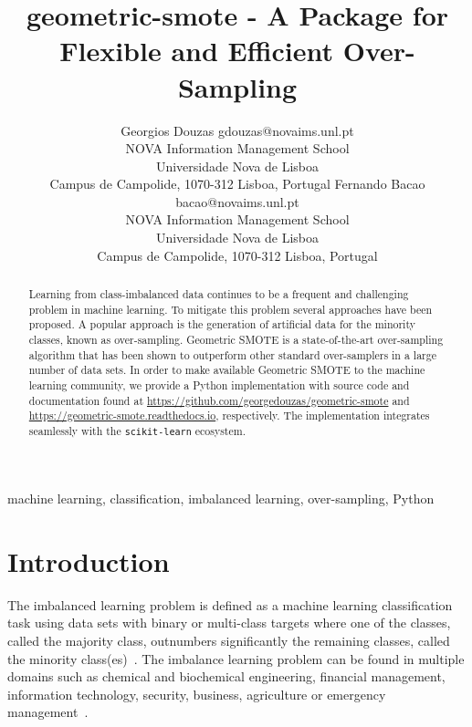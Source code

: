 \documentclass[twoside,11pt]{article}
\begin{document}
\title{geometric-smote - A Package for Flexible and Efficient Over-Sampling}

\author{\name Georgios Douzas \email gdouzas@novaims.unl.pt \\
       \addr NOVA Information Management School\\
       Universidade Nova de Lisboa\\
       Campus de Campolide, 1070-312 Lisboa, Portugal \AND \name Fernando Bacao
       \email bacao@novaims.unl.pt \\
       \addr NOVA Information Management School\\
       Universidade Nova de Lisboa\\
       Campus de Campolide, 1070-312 Lisboa, Portugal}

\editor{}

\maketitle

\begin{abstract}%
	Learning from class-imbalanced data continues to be a frequent and
	challenging problem in machine learning. To mitigate this problem several
	approaches have been proposed. A popular approach is the generation of
	artificial data for the minority classes, known as over-sampling. Geometric
	SMOTE is a state-of-the-art over-sampling algorithm that has been shown to
	outperform other standard over-samplers in a large number of data sets. In
	order to make available Geometric SMOTE to the machine learning community,
	we provide a Python implementation with source code and documentation found
	at \url{https://github.com/georgedouzas/geometric-smote} and
	\url{https://geometric-smote.readthedocs.io}, respectively. The
	implementation integrates seamlessly with the \texttt{scikit-learn}
	ecosystem.
\end{abstract}

\begin{keywords}
  machine learning, classification, imbalanced learning, over-sampling, Python
\end{keywords}

\section{Introduction}

The imbalanced learning problem is defined as a machine learning classification
task using data sets with binary or multi-class targets where one of the
classes, called the majority class, outnumbers significantly the remaining
classes, called the minority class(es)~\citep{Chawla2003}. The imbalance
learning problem can be found in multiple domains such as chemical and
biochemical engineering, financial management, information technology, security,
business, agriculture or emergency management~\citep{Haixiang2017}. 
\end{document}
